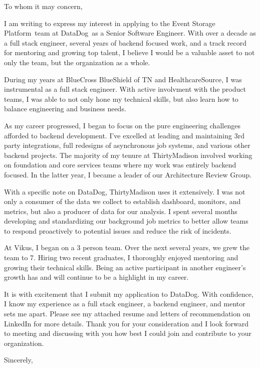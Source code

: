 
\usepackage{parskip}

\newcommand{\applyteam}{Event Storage Platform}
\newcommand{\applycompany}{DataDog}
\newcommand{\applyrole}{Senior Software Engineer}





To whom it may concern,

I am writing to express my interest in applying to the \applyteam\ team at \applycompany\ as a \applyrole.
With over a decade as a full stack engineer,
several years of backend focused work, and a track record for mentoring and growing top talent, I
believe I would be a valuable asset to not only the team, but the organization as a whole.

During my years at BlueCross BlueShield of TN and HealthcareSource, I was instrumental as a full stack
engineer. With active involvment with the product teams, I was able to not only hone my technical skills,
but also learn how to balance engineering and business needs.

As my career progressed, I began to focus on the pure engineering challenges afforded
to backend development. I've excelled at leading and maintaining 3rd party integrations, full redesigns of asynchronous
job systems, and various other backend projects. The majority of my tenure at ThirtyMadison involved
working on foundation and core services teams where my work was entirely backend focused. In the latter year,
I became a leader of our Architecture Review Group.

With a specific note on DataDog, ThirtyMadison uses it extensively. I was not only a consumer of the data we collect
to establish dashboard, monitors, and metrics, but also a producer of data for our analysis. I spent several months
developing and standardizing our background job metrics to better allow teams to respond proactively to 
potential issues and reduce the risk of incidents.

At Vikus, I began on a 3 person team. Over the next several years, we grew the team to 7.
Hiring two recent graduates, I thoroughly enjoyed mentoring and growing their technical skills. Being 
an active participant in another engineer's growth has and will continue to be a highlight in my career.

It is with excitement that I submit my application to \applycompany. With confidence, I know my experience as a
full stack engineer, a backend engineer, and mentor sets me apart. Please see my attached resume and letters of
recommendation on LinkedIn for more details. Thank you for your consideration and I look forward to meeting and
discussing with you how best I could join and contribute to your organization.

\hfill \break
Sincerely,\\
\name

